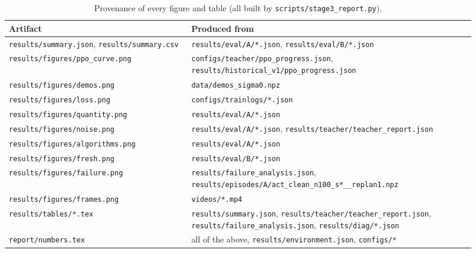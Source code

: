 \begin{table}[t]
\centering
\scriptsize
%
\begin{tabular}{p{0.36\linewidth}p{0.56\linewidth}}
\toprule
Artifact & Produced from \\
\midrule
\nolinkurl{results/summary.json}, \nolinkurl{results/summary.csv} & \nolinkurl{results/eval/A/*.json}, \nolinkurl{results/eval/B/*.json} \\
\nolinkurl{results/figures/ppo_curve.png} & \nolinkurl{configs/teacher/ppo_progress.json}, \nolinkurl{results/historical_v1/ppo_progress.json} \\
\nolinkurl{results/figures/demos.png} & \nolinkurl{data/demos_sigma0.npz} \\
\nolinkurl{results/figures/loss.png} & \nolinkurl{configs/trainlogs/*.json} \\
\nolinkurl{results/figures/quantity.png} & \nolinkurl{results/eval/A/*.json} \\
\nolinkurl{results/figures/noise.png} & \nolinkurl{results/eval/A/*.json}, \nolinkurl{results/teacher/teacher_report.json} \\
\nolinkurl{results/figures/algorithms.png} & \nolinkurl{results/eval/A/*.json} \\
\nolinkurl{results/figures/fresh.png} & \nolinkurl{results/eval/B/*.json} \\
\nolinkurl{results/figures/failure.png} & \nolinkurl{results/failure_analysis.json}, \nolinkurl{results/episodes/A/act_clean_n100_s*__replan1.npz} \\
\nolinkurl{results/figures/frames.png} & \nolinkurl{videos/*.mp4} \\
\nolinkurl{results/tables/*.tex} & \nolinkurl{results/summary.json}, \nolinkurl{results/teacher/teacher_report.json}, \nolinkurl{results/failure_analysis.json}, \nolinkurl{results/diag/*.json} \\
\nolinkurl{report/numbers.tex} & all of the above, \nolinkurl{results/environment.json}, \nolinkurl{configs/*} \\
\bottomrule
\end{tabular}
%
\caption{Provenance of every figure and table (all built by \texttt{scripts/stage3\_report.py}).}
\label{tab:prov}
\end{table}
